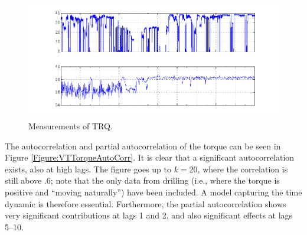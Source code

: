 \begin{figure}
\begin{center}
\includegraphics[scale=0.3]{./figures/VT_TRQ_values} 
\caption{\label{Figure:VTTorqueValues}  Measurements of TRQ.}
\end{center}
\end{figure}


The autocorrelation and partial autocorrelation of the torque can be seen in Figure \ref{Figure:VTTorqueAutoCorr}. It is clear that a significant autocorrelation exists, also at high lags. The figure goes up to $k=20$, where the correlation is still above .6; note that the only data from drilling (i.e., where the torque is positive and ``moving naturally'') have been included. A model capturing the time dynamic is therefore essential. Furthermore, the partial autocorrelation shows very significant contributions at lags 1 and 2, and also significant effects at lags 5--10.  


